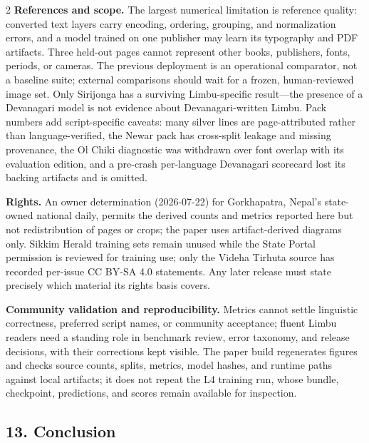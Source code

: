 \documentclass[
  10pt,
]{article}
\begin{document}
\begin{multicols}{2}
\textbf{References and scope.} The largest numerical limitation is
reference quality: converted text layers carry encoding, ordering,
grouping, and normalization errors, and a model trained on one publisher
may learn its typography and PDF artifacts. Three held-out pages cannot
represent other books, publishers, fonts, periods, or cameras. The
previous deployment is an operational comparator, not a baseline suite;
external comparisons should wait for a frozen, human-reviewed image set.
Only Sirijonga has a surviving Limbu-specific result---the presence of a
Devanagari model is not evidence about Devanagari-written Limbu. Pack
numbers add script-specific caveats: many silver lines are
page-attributed rather than language-verified, the Newar pack has
cross-split leakage and missing provenance, the Ol Chiki diagnostic was
withdrawn over font overlap with its evaluation edition, and a pre-crash
per-language Devanagari scorecard lost its backing artifacts and is
omitted.

\textbf{Rights.} An owner determination (2026-07-22) for Gorkhapatra,
Nepal's state-owned national daily, permits the derived counts and
metrics reported here but not redistribution of pages or crops; the
paper uses artifact-derived diagrams only. Sikkim Herald training sets
remain unused while the State Portal permission is reviewed for training
use; only the Videha Tirhuta source has recorded per-issue CC BY-SA 4.0
statements. Any later release must state precisely which material its
rights basis covers.

\textbf{Community validation and reproducibility.} Metrics cannot settle
linguistic correctness, preferred script names, or community acceptance;
fluent Limbu readers need a standing role in benchmark review, error
taxonomy, and release decisions, with their corrections kept visible.
The paper build regenerates figures and checks source counts, splits,
metrics, model hashes, and runtime paths against local artifacts; it
does not repeat the L4 training run, whose bundle, checkpoint,
predictions, and scores remain available for inspection.

\subsection{13. Conclusion}\label{conclusion}


\end{multicols}
\end{document}
